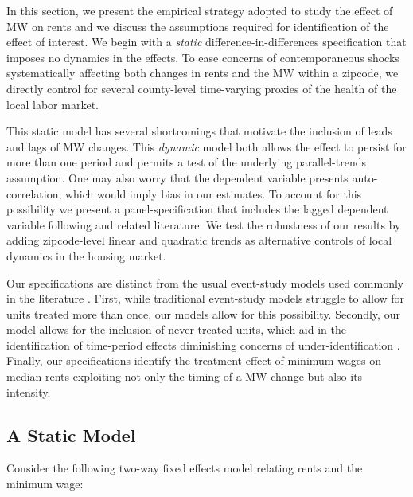 
In this section, we present the empirical strategy adopted to study the effect of MW 
on rents and we discuss the assumptions required for identification of the effect of 
interest. We begin with a \textit{static} difference-in-differences specification 
that imposes no dynamics in the effects. To ease concerns of contemporaneous shocks 
systematically affecting both changes in rents and the MW within a zipcode, we 
directly control for several county-level time-varying proxies of the health of the 
local labor market.

This static model has several shortcomings that motivate the inclusion of leads and 
lags of MW changes. This \textit{dynamic} model both allows the effect to persist for 
more than one period and permits a test of the underlying parallel-trends assumption. 
One may also worry that the dependent variable presents auto-correlation, which would 
imply bias in our estimates. To account for this possibility we present a 
panel-specification that includes the lagged dependent variable following 
\textcite{ArellanoBond1991} and related literature. We test the robustness of our 
results by adding zipcode-level linear and quadratic trends as alternative
controls of local dynamics in the housing market. 

Our specifications are distinct from the usual event-study models used commonly 
in the literature \parencite[discussed in, e.g.,][]{BorusyakJaravel2017, 
abraham2018}. First, while traditional event-study models struggle to allow for 
units treated more than once, our models allow for this possibility. Secondly, 
our model allows for the inclusion of never-treated units, which aid in the 
identification of time-period effects diminishing concerns of under-identification 
\parencite{BorusyakJaravel2017}. Finally, our specifications identify the treatment 
effect of minimum wages on median rents exploiting not only the timing of a MW change 
but also its intensity.
    
\subsection{A Static Model}
Consider the following two-way fixed effects model relating rents and the minimum wage:

